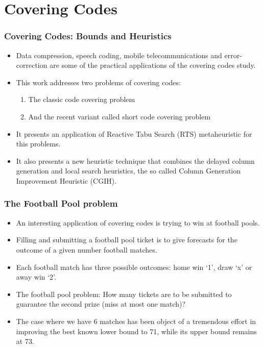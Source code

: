 \documentclass{beamer}
\begin{document}
\section{Covering Codes}

\begin{frame}
  \frametitle{Covering Codes: Bounds and Heuristics}
{	
\begin{itemize}
	\item<1-> Data compression, speech coding, mobile telecommunications and error-correction are some of the practical applications of the covering codes study.
	\item<2-> This work addresses two problems of covering codes: 
	\begin{enumerate}
		\item<3-> The classic code covering problem
		\item<4-> And the recent variant called short code covering problem
	\end{enumerate}
	\item<5-> It presents an application of Reactive Tabu Search (RTS) metaheuristic for this problems.
	\item<6-> It also presents a new heuristic technique that combines the delayed column generation and local search heuristics, the so called Column Generation Improvement Heuristic (CGIH).
\end{itemize}
}
\end{frame}


\begin{frame}
  \frametitle{The Football Pool problem}
{
	
\begin{itemize}
	\item<1-> An interesting application of covering codes is trying to win at football pools.
	\item<2-> Filling and submitting a football pool ticket is to give forecasts for the outcome of a given number football matches.
	\item<3-> Each football match has three possible outcomes: home win `1', draw `x' or away win `2'.
	\item<4-> The football pool problem: How many tickets are to be submitted to guarantee the second prize (miss at most one match)?
	\item<5-> The case where we have 6 matches has been object of a tremendous effort in improving the best known lower bound to 71, while its upper bound remains at 73.
\end{itemize}
}
\end{frame}
\end{document}
